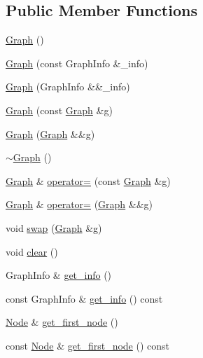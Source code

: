 \subsection*{Public Member Functions}
\begin{DoxyCompactItemize}
\item 
\hyperlink{class_designar_1_1_graph_a606f7514b8036679207da8a09ddfa6bd}{Graph} ()
\item 
\hyperlink{class_designar_1_1_graph_a61f5be7345295aa375f3a329ded36c17}{Graph} (const Graph\+Info \&\+\_\+info)
\item 
\hyperlink{class_designar_1_1_graph_a14f42f1511cc6e9edf7f54f656febf1e}{Graph} (Graph\+Info \&\&\+\_\+info)
\item 
\hyperlink{class_designar_1_1_graph_a4390fe2f03a3972a42c91e99c5570781}{Graph} (const \hyperlink{class_designar_1_1_graph}{Graph} \&g)
\item 
\hyperlink{class_designar_1_1_graph_a7c40e70047c42aaf71faa4739b87a10c}{Graph} (\hyperlink{class_designar_1_1_graph}{Graph} \&\&g)
\item 
\hyperlink{class_designar_1_1_graph_a2ea20f9cb46279210e1eadaebcfe27f0}{$\sim$\+Graph} ()
\item 
\hyperlink{class_designar_1_1_graph}{Graph} \& \hyperlink{class_designar_1_1_graph_a5f0a5acb7b0d5fbabd60294d40c804fa}{operator=} (const \hyperlink{class_designar_1_1_graph}{Graph} \&g)
\item 
\hyperlink{class_designar_1_1_graph}{Graph} \& \hyperlink{class_designar_1_1_graph_a6b6641789f049bfd98761cb0abaa9d60}{operator=} (\hyperlink{class_designar_1_1_graph}{Graph} \&\&g)
\item 
void \hyperlink{class_designar_1_1_graph_a84de29ab3f219f556a833ad21ab274d2}{swap} (\hyperlink{class_designar_1_1_graph}{Graph} \&g)
\item 
void \hyperlink{class_designar_1_1_graph_acfebca533d00dae0c40b0dd88f64296c}{clear} ()
\item 
Graph\+Info \& \hyperlink{class_designar_1_1_graph_a5b84c02e86c7887333df2d8934079678}{get\+\_\+info} ()
\item 
const Graph\+Info \& \hyperlink{class_designar_1_1_graph_adfbae301b6a211adaf1919bc41db176a}{get\+\_\+info} () const
\item 
\hyperlink{class_designar_1_1_graph_a5dfc7dba9d092ac489c72e40390c37d0}{Node} \& \hyperlink{class_designar_1_1_graph_ab9f34a6b6160f9e66a3103c78b13d7d6}{get\+\_\+first\+\_\+node} ()
\item 
const \hyperlink{class_designar_1_1_graph_a5dfc7dba9d092ac489c72e40390c37d0}{Node} \& \hyperlink{class_designar_1_1_graph_a2c27cdec559e9773deebec6f1af25a99}{get\+\_\+first\+\_\+node} () const

\end{DoxyCompactItemize}

